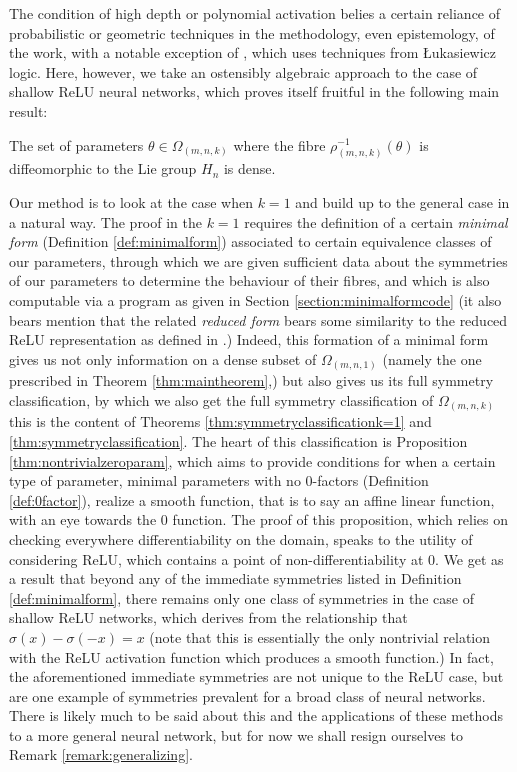 \documentclass[11pt,letterpaper]{amsart}
\begin{document}
\par The condition of high depth or polynomial activation belies a certain reliance of probabilistic or geometric techniques in the methodology, even epistemology, of the work, with a notable exception of \cite{zhang2026completeidentificationdeeprelu}, which uses techniques from Łukasiewicz logic. Here, however, we take an ostensibly algebraic approach to the case of shallow ReLU neural networks, which proves itself fruitful in the following main result:
\begin{theorem}\label{thm:maintheorem}
    The set of parameters $\theta\in \Omega_{(m,n,k)}$ where the fibre $ \rho_{(m,n,k)}^{-1}(\theta)$ is diffeomorphic to the Lie group $H_{n}$ is dense. 
\end{theorem}
\par Our method is to look at the case when $k=1$ and build up to the general case in a natural way. The proof in the $k=1$ requires the definition of a certain \textit{minimal form} (Definition \ref{def:minimalform}) associated to certain equivalence classes of our parameters, through which we are given sufficient data about the symmetries of our parameters to determine the behaviour of their fibres, and which is also computable via a program as given in Section \ref{section:minimalformcode} (it also bears mention that the related \textit{reduced form} bears some similarity to the reduced ReLU representation as defined in \cite{fu2025toricgeometryreluneural}.) Indeed, this formation of a minimal form gives us not only information on a dense subset of $\Omega_{(m,n,1)}$ (namely the one prescribed in Theorem \ref{thm:maintheorem},) but also gives us its full symmetry classification, by which we also get the full symmetry classification of $\Omega_{(m,n,k)}$ \textemdash this is the content of Theorems \ref{thm:symmetryclassificationk=1} and \ref{thm:symmetryclassification}. The heart of this classification is Proposition \ref{thm:nontrivialzeroparam}, which aims to provide conditions for when a certain type of parameter, minimal parameters with no 0-factors (Definition \ref{def:0factor}), realize a smooth function, that is to say an affine linear function, with an eye towards the 0 function. The proof of this proposition, which relies on checking everywhere differentiability on the domain, speaks to the utility of considering ReLU, which contains a point of non-differentiability at 0. We get as a result that beyond any of the immediate symmetries listed in Definition \ref{def:minimalform}, there remains only one class of symmetries in the case of shallow ReLU networks, which derives from the relationship that $\sigma(x)-\sigma(-x)=x$ (note that this is essentially the only nontrivial relation with the ReLU activation function which produces a smooth function.) In fact, the aforementioned immediate symmetries are not unique to the ReLU case, but are one example of symmetries prevalent for a broad class of neural networks. There is likely much to be said about this and the applications of these methods to a more general neural network, but for now we shall resign ourselves to Remark \ref{remark:generalizing}. 
\end{document}
